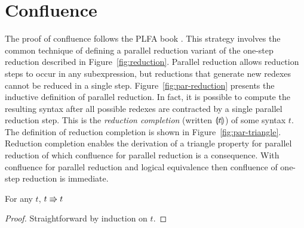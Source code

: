 \section{Confluence}



The proof of confluence follows the PLFA book \cite{plfa22.08}.
This strategy involves the common technique of defining a parallel reduction variant of the one-step reduction described in Figure~\ref{fig:reduction}.
Parallel reduction allows reduction steps to occur in any subexpression, but reductions that generate new redexes cannot be reduced in a single step.
Figure~\ref{fig:par-reduction} presents the inductive definition of parallel reduction.
In fact, it is possible to compute the resulting syntax after all possible redexes are contracted by a single parallel reduction step.
This is the \textit{reduction completion} (written $\llparenthesis {t} \rrparenthesis$) of some syntax $t$.
The definition of reduction completion is shown in Figure~\ref{fig:par-triangle}.
Reduction completion enables the derivation of a triangle property for parallel reduction of which confluence for parallel reduction is a consequence.
With confluence for parallel reduction and logical equivalence then confluence of one-step reduction is immediate.



\begin{lemma}
    For any $t$, $t \Rrightarrow t$
    \label{lem:a:par_refl}
\end{lemma}
\begin{proof}
    Straightforward by induction on $t$.
\end{proof}

